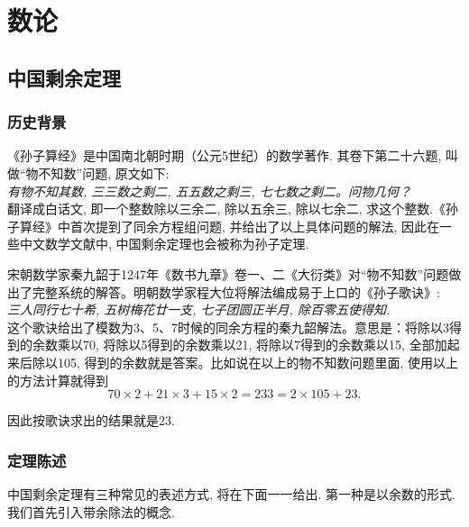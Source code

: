 \documentclass[color=green,mathpazo,titlestyle=hang]{elegantbook}
\author{Huyi Chen}
\begin{document}
\maketitle
\tableofcontents
\mainmatter

\chapter{数论}

\section{中国剩余定理}

\subsection{历史背景}
《孙子算经》是中国南北朝时期（公元5世纪）的数学著作\cite{szsj}. 其卷下第二十六题, 叫做“物不知数”问题, 原文如下:\\ 

\emph{有物不知其数, 三三数之剩二, 五五数之剩三, 七七数之剩二。问物几何？}\\ 


翻译成白话文, 即一个整数除以三余二, 除以五余三, 除以七余二, 求这个整数.《孙子算经》中首次提到了同余方程组问题, 并给出了以上具体问题的解法, 因此在一些中文数学文献中, 中国剩余定理也会被称为孙子定理.

宋朝数学家秦九韶于1247年《数书九章》卷一、二《大衍类》对“物不知数”问题做出了完整系统的解答。明朝数学家程大位将解法编成易于上口的《孙子歌诀》\cite{szgj}:\\ 

\emph{三人同行七十希, 五树梅花廿一支, 七子团圆正半月, 除百零五使得知.}\\

这个歌诀给出了模数为3、5、7时候的同余方程的秦九韶解法。意思是：将除以3得到的余数乘以70, 将除以5得到的余数乘以21, 将除以7得到的余数乘以15, 全部加起来后除以105, 得到的余数就是答案。比如说在以上的物不知数问题里面, 使用以上的方法计算就得到
\[ 70\times 2+21\times 3+15\times 2=233=2\times 105+23.\] 

因此按歌诀求出的结果就是23.



\subsection{定理陈述}
  中国剩余定理有三种常见的表述方式, 将在下面一一给出.
  第一种是以余数的形式.我们首先引入带余除法的概念.
  
\end{document}
